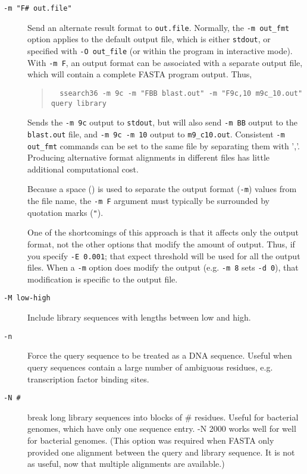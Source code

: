 \documentclass[11pt]{article}
\begin{document}
\begin{description}
\item[\texttt{-m "F\# out.file"}] Send an alternate result format to \texttt{out.file}.
Normally, the \texttt{-m out\_fmt} option applies to the default output
file, which is either \texttt{stdout}, or specified with \texttt{-O out\_file} (or within
the program in interactive mode). With \texttt{-m F}, an output format can be
associated with a separate output file, which will contain a complete
FASTA program output.  Thus,
\begin{quote}
\begin{small}
\begin{verbatim}
  ssearch36 -m 9c -m "FBB blast.out" -m "F9c,10 m9c_10.out" query library
\end{verbatim}
\end{small}
\end{quote}
Sends the \texttt{-m 9c} output to \texttt{stdout}, but will also send
\texttt{-m BB} output to the \texttt{blast.out} file, and \texttt{-m 9c -m
  10} output to \texttt{m9\_c10.out}.  Consistent \texttt{-m out\_fmt}
commands can be set to the same file by separating them with ','.
Producing alternative format alignments in different files has little
additional computational cost.

Because a space (\textvisiblespace) is used to separate the output
format (\texttt{-m}) values from the file name, the \texttt{-m F}
argument must typically be surrounded by quotation marks (\texttt{"}).

One of the shortcomings of this approach is that it affects only the
output format, not the other options that modify the amount of output.
Thus, if you specify \texttt{-E 0.001}; that expect threshold will be
used for all the output files.  When a \texttt{-m} option does modify
the output (e.g. \texttt{-m 8} sets \texttt{-d 0}), that modification
is specific to the output file.

\item[\texttt{-M low-high}]
Include library sequences with lengths between low and
high.
\item[\texttt{-n}]
Force the query sequence to be treated as a DNA sequence.  
Useful when query sequences contain a large number of
ambiguous residues, e.g. transcription factor binding sites.
\item[\texttt{-N \#}]
break long library sequences into blocks of \# residues.  Useful for
bacterial genomes, which have only one sequence entry.  -N 2000 works
well for well for bacterial genomes. (This option was required when
FASTA only provided one alignment between the query and library
sequence.  It is not as useful, now that multiple alignments are
available.)


\end{description}
\end{document}
